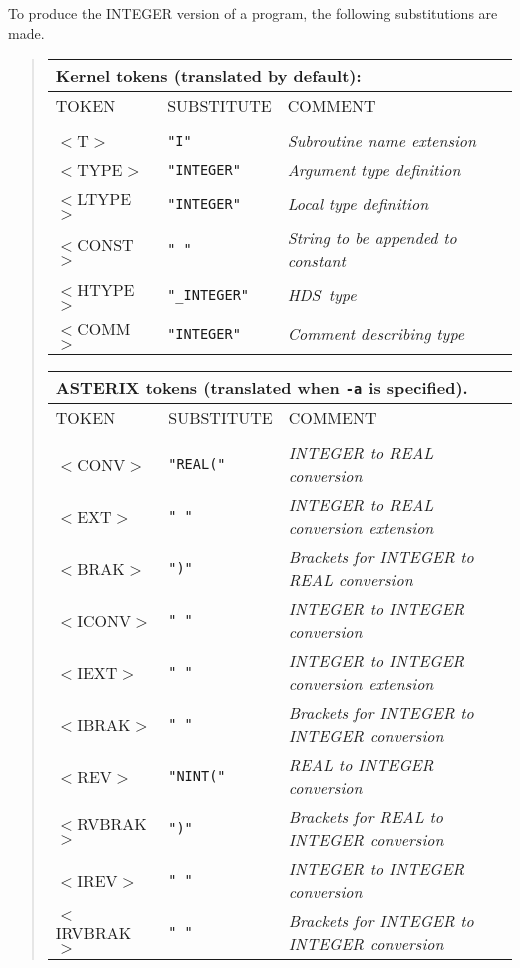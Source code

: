 \documentclass[twoside,11pt,nolof]{starlink}
\providecommand{\HDS}{{\footnotesize HDS}\normalsize}
\begin{document}
To produce the INTEGER version of a program, the following substitutions
are made.
\begin{quote}
\begin{tabular}{lll}
\multicolumn{3}{l}{\bf{Kernel} tokens (translated by default):}\\
\hline
TOKEN  &SUBSTITUTE   &COMMENT\\
\\
$<$T$>$     &\texttt{"I"}         &\emph{Subroutine name extension}\\
$<$TYPE$>$  &\texttt{"INTEGER"}   &\emph{Argument type definition}\\
$<$LTYPE$>$ &\texttt{"INTEGER"}   &\emph{Local type definition}\\
$<$CONST$>$ &\texttt{" "}         &\emph{String to be appended to constant}\\
$<$HTYPE$>$ &\texttt{"\_INTEGER"} &\emph{\HDS\ type}\\
$<$COMM$>$  &\texttt{"INTEGER"}   &\emph{Comment describing type}\\
\end{tabular}

\begin{tabular}{lll}
\multicolumn{3}{l}{\bf{ASTERIX} tokens (translated when \texttt{-a} is specified).}\\
\hline
TOKEN  &SUBSTITUTE   &COMMENT\\
\\
$<$CONV$>$     &\texttt{"REAL("} &\emph{INTEGER to REAL conversion}\\
$<$EXT$>$      &\texttt{" "}   &\emph{INTEGER to REAL conversion extension}\\
$<$BRAK$>$     &\texttt{")"}     &\emph{Brackets for INTEGER to REAL conversion}\\
$<$ICONV$>$    &\texttt{" "}     &\emph{INTEGER to INTEGER conversion}\\
$<$IEXT$>$     &\texttt{" "}     &\emph{INTEGER to INTEGER conversion extension}\\
$<$IBRAK$>$    &\texttt{" "}     &\emph{Brackets for INTEGER to INTEGER conversion}\\
$<$REV$>$      &\texttt{"NINT("} &\emph{REAL to INTEGER conversion}\\
$<$RVBRAK$>$   &\texttt{")"}     &\emph{Brackets for REAL to INTEGER conversion}\\
$<$IREV$>$     &\texttt{" "}     &\emph{INTEGER to INTEGER conversion}\\
$<$IRVBRAK$>$  &\texttt{" "}     &\emph{Brackets for INTEGER to INTEGER
conversion}\\
\end{tabular}
\end{quote}
\end{document}
